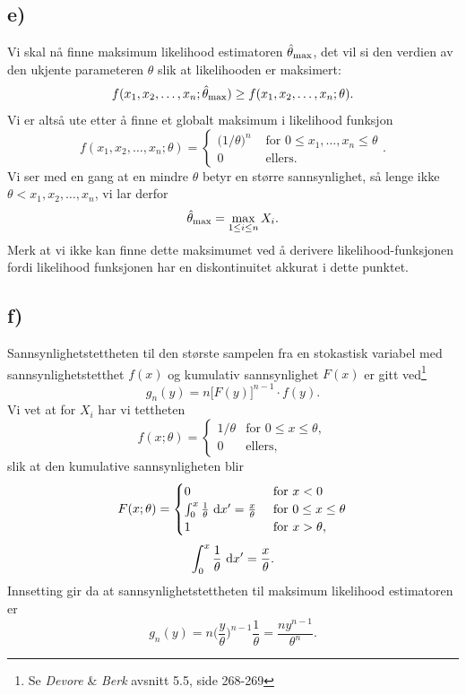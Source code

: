 \documentclass[a4paper, 11pt, titlepage, english]{article}
\renewcommand{\d}{{\rm d}}
\begin{document}
\subsection*{e)}
Vi skal nå finne maksimum likelihood estimatoren $\hat{\theta}_{\rm max}$, det vil si den verdien av den ukjente parameteren $\theta$ slik at likelihooden er maksimert: 
$$f(x_1, x_2, \ldots, x_n; \hat{\theta}_{\rm max}) \geq f(x_1, x_2, \ldots, x_n; \theta).$$ 
Vi er altså ute etter å finne et globalt maksimum i likelihood funksjon
$$
f(x_1, x_2, \ldots, x_n; \theta) = \begin{cases}
                                      \big(1/\theta)^n & \mbox{ for } 0 \leq x_1, \ldots, x_n \leq \theta\\
                                      0 & \mbox { ellers.}
                                     \end{cases}.
$$
Vi ser med en gang at en mindre $\theta$ betyr en større sannsynlighet, så lenge ikke $\theta < x_1, x_2, \ldots, x_n$, vi lar derfor 
$$\hat{\theta}_{\rm max} = \max_{1\leq i\leq n} X_i.$$
Merk at vi ikke kan finne dette maksimumet ved å derivere likelihood-funksjonen fordi likelihood funksjonen har en diskontinuitet akkurat i dette punktet.

\subsection*{f)}
Sannsynlighetstettheten til den største sampelen fra en stokastisk variabel med sannsynlighetstetthet $f(x)$ og kumulativ sannsynlighet $F(x)$  er gitt ved\footnote{Se \emph{Devore} \& \emph{Berk} avsnitt 5.5, side 268-269}
$$g_n(y) = n\big[F(y)\big]^{n-1} \cdot f(y).$$
Vi vet at for $X_i$ har vi tettheten
$$f(x; \theta) = \begin{cases}
                  1/\theta & \mbox{for } 0 \leq x \leq \theta, \\
                  0 & \mbox{ellers},
                 \end{cases}$$
slik at den kumulative sannsynligheten blir
$$F(x; \theta) = \begin{cases}
		  0 & \mbox{ for } x < 0 \\
		  \int_0^x  \frac{1}{\theta} \ \d x' = \frac{x}{\theta} & \mbox{ for } 0 \leq x \leq \theta \\
		  1 & \mbox{ for } x > \theta,
                 \end{cases}
                 $$
$$\int_0^x  \frac{1}{\theta} \ \d x' = \frac{x}{\theta}.$$
Innsetting gir da at sannsynlighetstettheten til maksimum likelihood estimatoren er
$$g_n(y) = n\bigg(\frac{y}{\theta}\bigg)^{n-1} \frac{1}{\theta} = \frac{ny^{n-1}}{\theta^n}.$$ 
\end{document}
